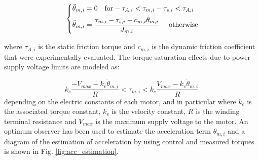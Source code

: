 \begin{equation}\DIFaddbegin \DIFadd{
\label{tau_acc}
}\DIFaddend \left \{
\begin{aligned}
\ddot{\theta}_{m,i} & =0 \quad \text{for} -\tau_{A,i}<\tau_{m,i}-\tau_{s,i}<\tau_{A,i} \\
\ddot{\theta}_{m,i} & =\frac{\tau_{m,i}-\tau_{s,i}  -c_{m,i}\dot{\theta}_{m,i}}{J_{m,i}} \quad \text{ otherwise}
\end{aligned}
\right .
\DIFdelbegin %
\DIFdelend \end{equation}

where $\tau_{A,i}$ is the static friction torque and $c_{m,i}$ is the dynamic friction coefficient that were experimentally evaluated.
The torque saturation effects due to power supply voltage limits are modeled as:

\begin{equation}
k_c\frac{-V_{max}-k_v\dot{\theta}_{m,i}}{R}<\tau_{m,i}<k_c\frac{V_{max}-k_v\dot{\theta}_{m,i}}{R}
\label{torque_saturation}
\end{equation}
depending on the electric constants of each motor, and in particular  where $k_c$ is the associated torque constant, $k_v$ is the velocity constant, $R$ is the winding terminal resistance and $V_{max}$ is the maximum supply voltage to the motor.
An optimum  \DIFdelbegin {}\DIFdelend observer has been used to estimate the acceleration term $\ddot{\theta}_{m,i}$ and a diagram of the estimation of acceleration by using control and measured torques is shown in Fig. \ref{fig:acc_estimation}.

\DIFdelbegin %
\DIFdelend \DIFaddbegin \begin{figure*}[htb]
	\DIFaddendFL \centering
\DIFdelbeginFL %
\DIFdelendFL %
	\DIFaddbeginFL \def\svgwidth{2.15\columnwidth}
	\begin{footnotesize}
		
	\end{footnotesize}
	\DIFaddendFL \caption{Estimation of the acceleration from torque measurement\DIFaddbeginFL {}\DIFaddendFL }
	\label{fig:acc_estimation}
\DIFdelbeginFL %
\DIFdelendFL \DIFaddbeginFL \end{figure*}
\DIFaddend %
%

